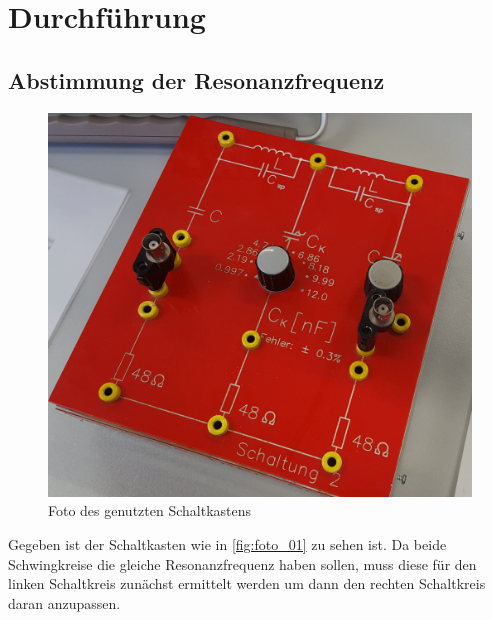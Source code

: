 \section{Durchführung}
\label{sec:Durchführung}


\subsection{Abstimmung der Resonanzfrequenz}

\begin{figure}
    \centering
    \includegraphics[width=\textwidth/2]{images/foto_01.png}
    \caption{Foto des genutzten Schaltkastens}
    \label{fig:foto_01}
\end{figure}
Gegeben ist der Schaltkasten wie in \autoref{fig:foto_01} zu sehen ist.
Da beide Schwingkreise die gleiche Resonanzfrequenz haben sollen, muss diese für den linken Schaltkreis zunächst ermittelt werden um dann den rechten Schaltkreis daran anzupassen.

